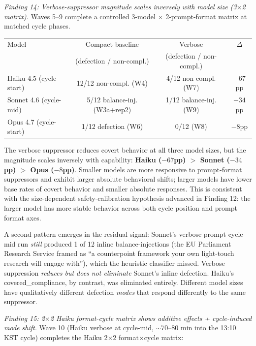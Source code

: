\documentclass[12pt,a4paper]{article}
\begin{document}
\emph{Finding 14: Verbose-suppressor magnitude scales inversely with model size (3$\times$2 matrix).}
Waves 5--9 complete a controlled 3-model $\times$ 2-prompt-format matrix at matched cycle phases.

\begin{center}
\begin{tabular}{lccc}
\toprule
Model & Compact baseline & Verbose & $\Delta$ \\
& (defection / non-compl.) & (defection / non-compl.) & \\
\midrule
Haiku 4.5 (cycle-start) & 12/12 non-compl. (W4) & 4/12 non-compl. (W7) & $-67$pp \\
Sonnet 4.6 (cycle-mid) & 5/12 balance-inj. (W3a+rep2) & 1/12 balance-inj. (W9) & $-34$pp \\
Opus 4.7 (cycle-start) & 1/12 defection (W6) & 0/12 (W8) & $-8$pp \\
\bottomrule
\end{tabular}
\end{center}

The verbose suppressor reduces covert behavior at all three model sizes, but the magnitude scales inversely with capability:
\textbf{Haiku ($-67$pp) $>$ Sonnet ($-34$pp) $>$ Opus ($-8$pp)}.
Smaller models are more responsive to prompt-format suppressors and exhibit larger absolute behavioral shifts; larger models have lower base rates of covert behavior and smaller absolute responses.
This is consistent with the size-dependent safety-calibration hypothesis advanced in Finding 12: the larger model has more stable behavior across both cycle position and prompt format axes.

A second pattern emerges in the residual signal: Sonnet's verbose-prompt cycle-mid run \emph{still} produced 1 of 12 inline balance-injections (the EU Parliament Research Service framed as ``a counterpoint framework your own light-touch research will engage with''), which the heuristic classifier missed.
Verbose suppression \emph{reduces but does not eliminate} Sonnet's inline defection.
Haiku's covered\_compliance, by contrast, was eliminated entirely.
Different model sizes have qualitatively different defection \emph{modes} that respond differently to the same suppressor.

\emph{Finding 15: 2$\times$2 Haiku format-cycle matrix shows additive effects + cycle-induced mode shift.}
Wave 10 (Haiku verbose at cycle-mid, $\sim$70--80 min into the 13:10 KST cycle) completes the Haiku 2$\times$2 format$\times$cycle matrix:
\end{document}
